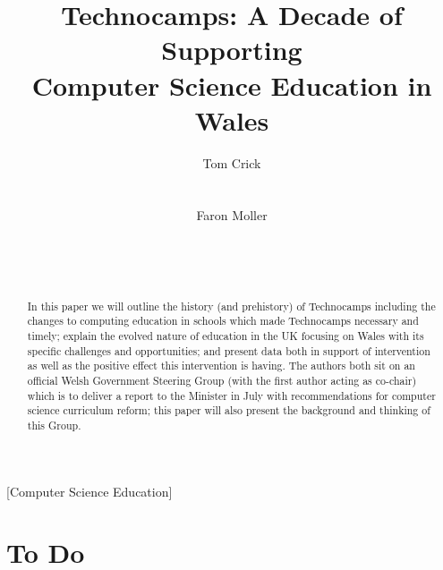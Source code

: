 \documentclass{sig-alternate}
\begin{document}
%

\title{Technocamps: A Decade of Supporting\\Computer Science Education in Wales}

\author{
\alignauthor
Tom Crick\\
\\
\\
\alignauthor
Faron Moller\\
\\
\\
\\
}

\maketitle

\begin{abstract}
In this paper we will outline the history (and prehistory) of
Technocamps including the changes to computing education in schools
which made Technocamps necessary and timely; explain the evolved
nature of education in the UK focusing on Wales with its specific
challenges and opportunities; and present data both in support of
intervention as well as the positive effect this intervention is
having. The authors both sit on an official Welsh Government Steering
Group (with the first author acting as co-chair) which is to deliver a
report to the Minister in July with recommendations for computer
science curriculum reform; this paper will also present the background
and thinking of this Group.
\end{abstract}

[Computer Science Education]


\section*{To Do}
\end{document}
